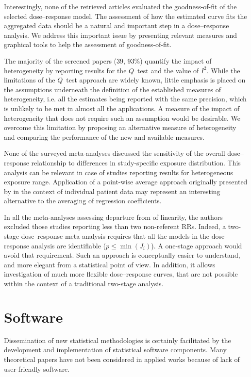 \documentclass[11pt,a4paper,twoside,openany]{book}\usepackage{knitr}
\begin{document}
{{Interestingly, none of the retrieved articles evaluated the goodness-of-fit of the selected dose--response model. The assessment of how the estimated curve fits the aggregated data should be a natural and important step in a dose--response analysis. We address this important issue by presenting relevant measures and graphical tools to help the assessment of goodness-of-fit.

The majority of the screened papers (39, 93\%) quantify the impact of heterogeneity by reporting results for the $Q$~test and the value of $I^2$. While the limitations of the $Q$~test approach are widely known, little emphasis is placed on the assumptions underneath the definition of the established measures of heterogeneity, i.e.  all the estimates being reported with the same precision, which is unlikely to be met in almost all the applications. A measure of the impact of heterogeneity that does not require such an assumption would be desirable. We overcome this limitation by proposing an alternative measure of heterogeneity and comparing the performance of the new and available measures.

None of the surveyed meta-analyses discussed the sensitivity of the overall dose--response relationship to differences in study-specific exposure distribution. This analysis can be relevant in case of studies reporting results for heterogeneous exposure range. Application of a point-wise average approach originally presented by \cite{sauerbrei2011new} in the context of individual patient data may represent an interesting alternative to the averaging of regression coefficients. 

In all the meta-analyses assessing departure from of linearity, the authors excluded those studies reporting less than two non-referent RRs. Indeed, a two-stage dose--response meta-analysis requires that all the models in the dose--response analysis are identifiable ($p \le \min\left(J_i\right)$). A one-stage approach would avoid that requirement. Such an approach is conceptually easier to understand, and more elegant from a statistical point of view. In addition, it allows investigation of much more flexible dose--response curves, that are not possible within the context of a traditional two-stage analysis.

\section{Software}

Dissemination of new statistical methodologies is certainly facilitated by the development and implementation of statistical software components. Many theoretical papers have not been considered in applied works because of lack of user-friendly software. 

}}
\end{document}
